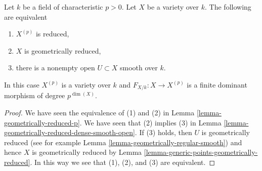 \begin{lemma}
\label{lemma-inseparable-deg-p-smooth}
Let $k$ be a field of characteristic $p > 0$. Let $X$ be a variety over $k$.
The following are equivalent
\begin{enumerate}
\item $X^{(p)}$ is reduced,
\item $X$ is geometrically reduced,
\item there is a nonempty open $U \subset X$ smooth over $k$.
\end{enumerate}
In this case $X^{(p)}$ is a variety over $k$ and $F_{X/k} : X \to X^{(p)}$
is a finite dominant morphism of degree $p^{\dim(X)}$.
\end{lemma}

\begin{proof}
We have seen the equivalence of (1) and (2) in
Lemma \ref{lemma-geometrically-reduced-p}.
We have seen that (2) implies (3) in
Lemma \ref{lemma-geometrically-reduced-dense-smooth-open}.
If (3) holds, then $U$ is geometrically reduced
(see for example Lemma \ref{lemma-geometrically-regular-smooth})
and hence $X$ is geometrically reduced by
Lemma \ref{lemma-generic-points-geometrically-reduced}.
In this way we see that (1), (2), and (3) are equivalent.


\end{proof}
